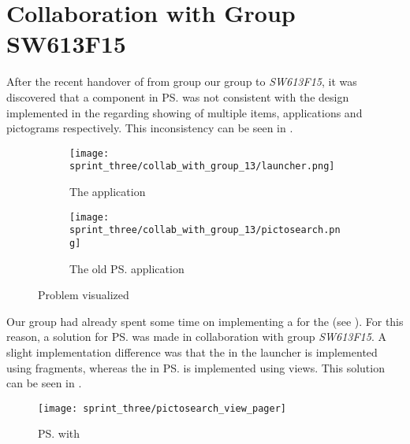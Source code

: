 
\section{Collaboration with Group SW613F15}
\label{sec:collaboration_with_group_sw613f15}

After the recent handover of \gc from group our group to \emph{SW613F15}, it was discovered that a component in \ps was not consistent with the design implemented in the \launcher regarding showing of multiple items, applications and pictograms respectively. This inconsistency can be seen in .

\begin{figure}[!htbp]
    \centering

    \begin{subfigure}[t]{0.75\textwidth}
        \texttt{[image: sprint\_three/collab\_with\_group\_13/launcher.png]}
        \caption{The \launcher application}
        \label{fig:collab_with_group_13_launhcer}
        \vspace*{1cm}
    \end{subfigure}
    \hfill
    \begin{subfigure}[t]{0.75\textwidth}
        \texttt{[image: sprint\_three/collab\_with\_group\_13/pictosearch.png]}
        \caption{The old \ps application}
        \label{fig:collab_with_group_13_pictosearch}
    \end{subfigure}
    
    \caption{Problem visualized}
    \label{fig:collab_with_group_13}
\end{figure}

Our group had already spent some time on implementing a  for the \launcher (see ). For this reason, a solution for \ps was made in collaboration with group \emph{SW613F15}. A slight implementation difference was that the  in the launcher is implemented using fragments, whereas the  in \ps is implemented using views. This solution can be seen in . 

\begin{figure}[!htbp]
    \centering
    \texttt{[image: sprint\_three/pictosearch\_view\_pager]}
    \caption{\ps with }
    \label{fig:pictosearch_view_pager}
\end{figure}


